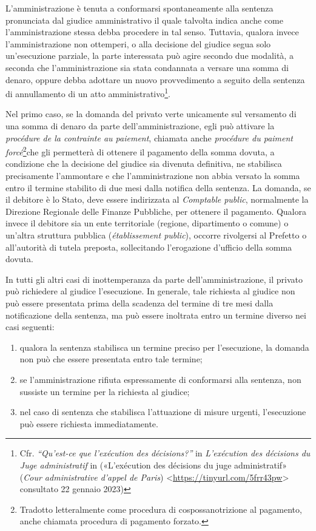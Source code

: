 \documentclass[12pt,it,a4paper,]{report}
\providecommand{\tightlist}{%
  \setlength{\itemsep}{0pt}\setlength{\parskip}{0pt}}
\begin{document}
L'amministrazione è tenuta a conformarsi spontaneamente alla sentenza
pronunciata dal giudice amministrativo il quale talvolta indica anche
come l'amministrazione stessa debba procedere in tal senso. Tuttavia,
qualora invece l'amministrazione non ottemperi, o alla decisione del
giudice segua solo un'esecuzione parziale, la parte interessata può
agire secondo due modalità, a seconda che l'amministrazione sia stata
condannata a versare una somma di denaro, oppure debba adottare un nuovo
provvedimento a seguito della sentenza di annullamento di un atto
amministrativo\footnote{Cfr. \emph{``Qu'est-ce que l'exécution des
  décisions?''} in \emph{L'exécution des décisions du Juge
  administratif} in ({«L'exécution des décisions du juge administratif»}
  (\emph{Cour administrative d'appel de Paris})
  \textless{}\url{https://tinyurl.com/5frr43pw}\textgreater{} consultato
  22 gennaio 2023)}.

Nel primo caso, se la domanda del privato verte unicamente sul
versamento di una somma di denaro da parte dell'amministrazione, egli
può attivare la \emph{procédure de la contrainte au paiement}, chiamata
anche \emph{procédure du paiment forcé}\footnote{Tradotto letteralmente
  come procedura di cospossanotrizione al pagamento, anche chiamata
  procedura di pagamento forzato.}che gli permetterà di ottenere il
pagamento della somma dovuta, a condizione che la decisione del giudice
sia divenuta definitiva, ne stabilisca precisamente l'ammontare e che
l'amministrazione non abbia versato la somma entro il termine stabilito
di due mesi dalla notifica della sentenza. La domanda, se il debitore è
lo Stato, deve essere indirizzata al \emph{Comptable public},
normalmente la Direzione Regionale delle Finanze Pubbliche, per ottenere
il pagamento. Qualora invece il debitore sia un ente territoriale
(regione, dipartimento o comune) o un'altra struttura pubblica
(\emph{établissement public}), occorre rivolgersi al Prefetto o
all'autorità di tutela preposta, sollecitando l'erogazione d'ufficio
della somma dovuta.

In tutti gli altri casi di inottemperanza da parte dell'amministrazione,
il privato può richiedere al giudice l'esecuzione. In generale, tale
richiesta al giudice non può essere presentata prima della scadenza del
termine di tre mesi dalla notificazione della sentenza, ma può essere
inoltrata entro un termine diverso nei casi seguenti:

\begin{enumerate}
\def\labelenumi{\arabic{enumi})}
\tightlist
\item
  qualora la sentenza stabilisca un termine preciso per l'esecuzione, la
  domanda non può che essere presentata entro tale termine;
\item
  se l'amministrazione rifiuta espressamente di conformarsi alla
  sentenza, non sussiste un termine per la richiesta al giudice;
\item
  nel caso di sentenza che stabilisca l'attuazione di misure urgenti,
  l'esecuzione può essere richiesta immediatamente.
\end{enumerate}
\end{document}
